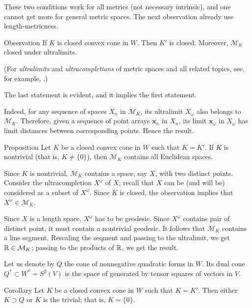 \documentclass[a4paper,10pt]{article}
\begin{document}
These two conditions work for all metrics (not necessary intrinsic),
and one cannot get more for general metric spaces.
The next observation already use length-metricness.

\begin{thm}{Observation}
If $K$ is closed convex cone in $W$.
Then $K'$ is closed.
Moreover, $\mathcal{M}_K$ closed under ultralimits.
\end{thm}


(For \emph{ultralimits} and \emph{ultracompletions} of metric spaces and all related topics, see, for example, \cite{petrunin2023}.)

The last statement is evident, and it implies the first statement.

Indeed, for any sequence of spaces $X_n$ in $\mathcal{M}_K$, its ultralimit $X_\omega$ also belongs to $\mathcal{M}_K$.
Therefore, given a sequence of point arrays $\bm{x}_n$ in $X_n$,
its limit $\bm{x}_\omega$ in $X_\omega$ has limit distances between corresponding points.
Hence the result.
\qeds

\begin{thm}{Proposition}\label{prop:Associated form}
Let $K$ be a closed convex cone in $W$ such that $K=K'$.
If $K$ is nontrivial (that is, $K\ne \{0\}$), then $\mathcal{M}_K$ contains all Euclidean spaces.
\end{thm}

Since $K$ is nontrivial, $\mathcal{M}_K$ contains a space, say $X$, with two distinct points.
Consider the ultracompletion $X^\omega$ of $X$;
recall that $X$ can be (and will be) considered as a subset of $X^\omega$.
Since $K$ is closed, the observation implies that $X^\omega\in \mathcal{M}_K$.

Since  $X$ is a length space, $X^\omega$ has to be geodesic.
Since $X^\omega$ contains pair of distinct point, it must contain a nontrivial geodesic.
It follows that $\mathcal{M}_K$ contains a line segment.
Rescaling the seqment and passing to the ultralimit, we get $\mathbb{R}\in \mathcal{M}_K$;
passing to the products of $\mathbb{R}$, we get the result. 
\qeds

Let us denote by $Q$ the cone of nonnegative quadratic forms in $W$.
Its dual cone $Q^*\subset W^*=S^2(V)$ is the space of generated by tensor squares of vectors in $V$. 

\begin{thm}{Corollary}
Let $K$ be a closed convex cone in $W$ such that $K=K'$.
Then either $K\supset Q$ or $K$ is the trivial; that is, $K=\{0\}$.
\end{thm}
\end{document}
